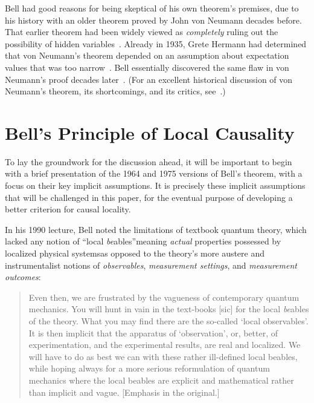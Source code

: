 \documentclass[12pt,english,prl,superscriptaddress,nobibnotes,nofootinbib]{revtex4-2}
\begin{document}
Bell had good reasons for being skeptical of his own theorem's premises,
due to his history with an older theorem proved by John von Neumann
decades before. That earlier theorem had been widely viewed as \emph{completely}
ruling out the possibility of hidden variables~\citep{vonNeumann:1927wadq,vonNeumann:1932mgdq,vonNeumann:2018mfoqmne}.
 Already in 1935, Grete Hermann had determined that von Neumann's
theorem depended on an assumption about expectation values that was
too narrow~\citep{hermann1935circularity,Seevinck:2017ctgghovnsnhvp}.
Bell essentially discovered the same flaw in von Neumann's proof decades
later~\citep{Bell:1966otpohviqm}. (For an excellent historical discussion
of von Neumann's theorem, its shortcomings, and its critics, see~\citep{Bacciagaluppi:2021tsibhavn12}.)

\section{Bell's Principle of Local Causality\label{sec:Bell's-Principle-of-Local-Causality}}

To lay the groundwork for the discussion ahead, it will be important
to begin with a brief presentation of the 1964 and 1975 versions of
Bell's theorem, with a focus on their key implicit assumptions. It
is precisely these implicit assumptions that will be challenged in
this paper,  for the eventual purpose of developing a better criterion
for causal locality.

In his 1990 lecture, Bell noted the limitations of textbook quantum
theory, which lacked any notion of ``local \emph{be}ables''\textemdash meaning
\emph{actual} properties possessed by localized physical systems\textemdash as
opposed to the theory's more austere and instrumentalist notions of
\emph{observables}, \emph{measurement settings}, and \emph{measurement outcomes}:
\begin{quotation}
Even then, we are frustrated by the vagueness of contemporary quantum
mechanics. You will hunt in vain in the text-books {[}sic{]} for the
local \emph{be}ables of the theory. What you may find there are the
so-called \textquoteleft local observables\textquoteright . It is
then implicit that the apparatus of \textquoteleft observation\textquoteright ,
or, better, of experimentation, and the experimental results, are
real and localized. We will have to do as best we can with these rather
ill-defined local beables, while hoping always for a more serious
reformulation of quantum mechanics where the local beables are explicit
and mathematical rather than implicit and vague. {[}Emphasis in the
original.{]}~\citep{Bell:1990lnc}
\end{quotation}
\end{document}
